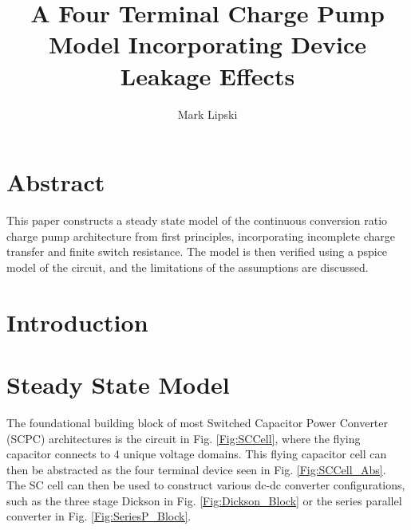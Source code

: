 \documentclass[conference]{IEEEtran}
\title{A Four Terminal Charge Pump Model Incorporating Device Leakage Effects}
\author{Mark Lipski}
\begin{document}
	\maketitle
	\section{Abstract}
	This paper constructs a steady state model of the continuous conversion ratio charge pump architecture from first principles, incorporating incomplete charge transfer and finite switch resistance. The model is then verified using a pspice model of the circuit, and the limitations of the assumptions are discussed.
	\section{Introduction}
	
	
	\section{Steady State Model}
	The foundational building block of most Switched Capacitor Power Converter (SCPC) architectures is the circuit in Fig. \ref{Fig:SCCell}, where the flying capacitor connects to 4 unique voltage domains. This flying capacitor cell can then be abstracted as the four terminal device seen in Fig. \ref{Fig:SCCell_Abs}. The SC cell can then be used to construct various dc-dc converter configurations, such as the three stage Dickson in Fig. \ref{Fig:Dickson_Block} or the series parallel converter in Fig. \ref{Fig:SeriesP_Block}.
	
\end{document}

